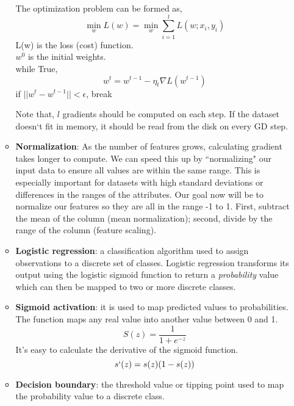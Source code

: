\documentclass[]{article}
\begin{document}
\begin{itemize}
\begin{itemize}
		The optimization problem can be formed as,
		\begin{equation}
		\min_{w}L(w)=\min_{w}{\sum_{i=1}^{l}L(w;x_i,y_i)}
		\end{equation}
		L(w) is the loss (cost) function.\\
		$w^0$ is the initial weights.\\
		while True,
		\begin{equation}
		w^t=w^{t-1}-\eta_t\nabla{L(w^{t-1})}
		\end{equation}
		if $||w^t-w^{t-1}||<\epsilon$, break
		
		Note that, $l$ gradients should be computed on each step. If the dataset doesn`t fit in memory, it should be read from the disk on every GD step.
		
		\item \textbf{Normalization}: As the number of features grows, calculating gradient takes longer to compute. We can speed this up by ``normalizing" our input data to ensure all values are within the same range. This is especially important for datasets with high standard deviations or differences in the ranges of the attributes. Our goal now will be to normalize our features so they are all in the range -1 to 1.
		First, subtract the mean of the column (mean normalization); second, divide by the range of the column (feature scaling).
		
		\item \textbf{Logistic regression}: a classification algorithm used to assign observations to a discrete set of classes. Logistic regression transforms its output using the logistic sigmoid function to return a \textit{probability} value which can then be mapped to two or more discrete classes.
		
		\item \textbf{Sigmoid activation}: it is used to map predicted values to probabilities. The function maps any real value into another value between 0 and 1.
		\begin{equation}
		S(z)=\frac{1}{1+e^{-z}}
		\end{equation}
		It's easy to calculate the derivative of the sigmoid function.
		\begin{equation}
		s`(z)=s(z)(1-s(z))
		\end{equation}
		
		\item \textbf{Decision boundary}: the threshold value or tipping point used to map the probability value to a discrete class.
		

\end{itemize}
\end{itemize}
\end{document}
